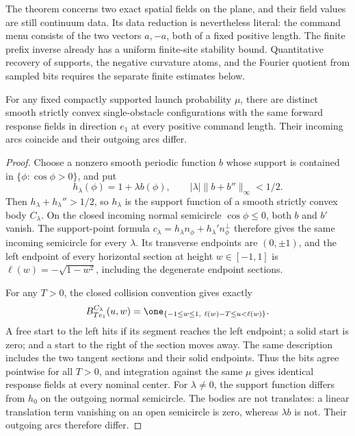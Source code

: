 The theorem concerns two exact spatial fields on the plane, and
their field values are still continuum data.  Its data reduction
is nevertheless literal: the command menu consists of the two
vectors $a,-a$, both of a fixed positive length.  The finite
prefix inverse already has a uniform finite-site stability bound.
Quantitative recovery of supports, the negative curvature atoms,
and the Fourier quotient from sampled bits requires the separate
finite estimates below.

\begin{proposition}
\label{prop:two-field-one-orientation}
For any fixed compactly supported launch probability $\mu$, there
are distinct smooth strictly convex single-obstacle configurations
with the same forward response fields in direction $e_1$ at every
positive command length.  Their incoming arcs coincide and their
outgoing arcs differ.
\end{proposition}
\begin{proof}
Choose a nonzero smooth periodic function $b$ whose support is
contained in $\{\phi:\cos\phi>0\}$, and put
\[
 h_\lambda(\phi)=1+\lambda b(\phi),\qquad
               |\lambda|\|b+b''\|_\infty<1/2.
\]
Then $h_\lambda+h_\lambda''>1/2$, so $h_\lambda$ is the support
function of a smooth strictly convex body $C_\lambda$.
On the closed incoming normal semicircle $\cos\phi\le0$, both
$b$ and $b'$ vanish.  The support-point formula
$c_\lambda=h_\lambda n_\phi+h_\lambda' n_\phi^\perp$
therefore gives the same incoming semicircle for every $\lambda$.
Its transverse endpoints are $(0,\pm1)$, and the left endpoint
of every horizontal section at height $w\in[-1,1]$ is
$\ell(w)=-\sqrt{1-w^2}$, including the degenerate endpoint sections.

For any $T>0$, the closed collision convention gives exactly
\[
 B_{Te_1}^{C_\lambda}(u,w)
   =\one_{\{-1\le w\le1,\ \ell(w)-T\le u<\ell(w)\}}.
\]
A free start to the left hits if its segment reaches the left
endpoint; a solid start is zero; and a start to the right of the
section moves away.  The same description includes the two
tangent sections and their solid endpoints.  Thus the bits agree
pointwise for all $T>0$, and integration against the same $\mu$
gives identical response fields at every nominal center.
For $\lambda\ne0$, the support function differs from $h_0$ on
the outgoing normal semicircle.  The bodies are not translates:
a linear translation term vanishing on an open semicircle is zero,
whereas $\lambda b$ is not.  Their outgoing arcs therefore differ.
\end{proof}
